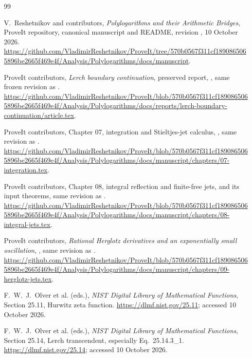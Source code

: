 \begin{thebibliography}{99}

V.~Reshetnikov and contributors, \emph{Polylogarithms and their Arithmetic
Bridges}, ProveIt repository, canonical manuscript and README, revision
, 10 October 2026.
\url{https://github.com/VladimirReshetnikov/ProveIt/tree/570b0567f311cf1890865065896be2665f469e4f/Analysis/Polylogarithms/docs/manuscript}.

ProveIt contributors, \emph{Lerch boundary continuation}, preserved report,
,
same frozen revision as \cite{repoManuscript}.
\url{https://github.com/VladimirReshetnikov/ProveIt/blob/570b0567f311cf1890865065896be2665f469e4f/Analysis/Polylogarithms/docs/reports/lerch-boundary-continuation/article.tex}.

ProveIt contributors, Chapter 07, integration and Stieltjes-jet calculus,
, same revision as \cite{repoManuscript}.
\url{https://github.com/VladimirReshetnikov/ProveIt/blob/570b0567f311cf1890865065896be2665f469e4f/Analysis/Polylogarithms/docs/manuscript/chapters/07-integration.tex}.

ProveIt contributors, Chapter 08, integral reflection and finite-free jets,
 and its input theorems, same revision
as \cite{repoManuscript}.
\url{https://github.com/VladimirReshetnikov/ProveIt/blob/570b0567f311cf1890865065896be2665f469e4f/Analysis/Polylogarithms/docs/manuscript/chapters/08-integral-jets.tex}.

ProveIt contributors, \emph{Rational Herglotz derivatives and an exponentially
small oscillation}, , same revision
as \cite{repoManuscript}.
\url{https://github.com/VladimirReshetnikov/ProveIt/blob/570b0567f311cf1890865065896be2665f469e4f/Analysis/Polylogarithms/docs/manuscript/chapters/09-herglotz-jets.tex}.

F.~W.~J.~Olver et al. (eds.), \emph{NIST Digital Library of Mathematical
Functions}, Section 25.11, Hurwitz zeta function.
\url{https://dlmf.nist.gov/25.11}; accessed 10 October 2026.

F.~W.~J.~Olver et al. (eds.), \emph{NIST Digital Library of Mathematical
Functions}, Section 25.14, Lerch transcendent, especially Eq.~25.14.3\_1.
\url{https://dlmf.nist.gov/25.14}; accessed 10 October 2026.


\end{thebibliography}
